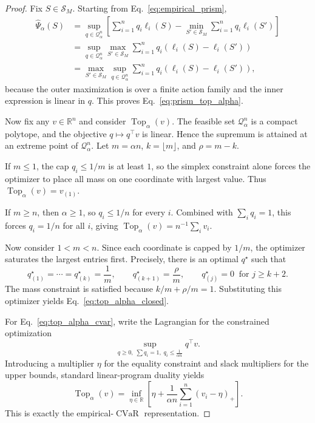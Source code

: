 \documentclass{article}
\newcommand{\RR}{\mathbb{R}}
\newcommand{\cQ}{\mathcal{Q}}
\newcommand{\cS}{\mathcal{S}}
\newcommand{\CVaR}{\operatorname{CVaR}}
\newcommand{\Top}{\operatorname{Top}}
\newcommand{\paren}[1]{\left( #1 \right)}
\newcommand{\loss}{\ell}
\newcommand{\1}{\mathbbm{1}}
\begin{document}
\begin{proof}
Fix \(S\in\cS_M\). Starting from Eq.~\eqref{eq:empirical_prism},
\begin{align}
    \widehat{\Psi}_\alpha(S)
    &=
    \sup_{q\in\cQ_\alpha^n}
    \left[
        \sum_{i=1}^{n} q_i \loss_i(S)
        -
        \min_{S'\in\cS_M}
        \sum_{i=1}^{n} q_i \loss_i(S')
    \right] \nonumber\\
    &=
    \sup_{q\in\cQ_\alpha^n}
    \max_{S'\in\cS_M}
    \sum_{i=1}^{n} q_i\paren{\loss_i(S)-\loss_i(S')} \nonumber\\
    &=
    \max_{S'\in\cS_M}
    \sup_{q\in\cQ_\alpha^n}
    \sum_{i=1}^{n} q_i\paren{\loss_i(S)-\loss_i(S')},
    \label{eq:proof_topalpha_swap}
\end{align}
because the outer maximization is over a finite action family and the inner expression is linear in \(q\). This proves Eq.~\eqref{eq:prism_top_alpha}.

Now fix any \(v\in\RR^n\) and consider \(\Top_\alpha(v)\). The feasible set \(\cQ_\alpha^n\) is a compact polytope, and the objective \(q\mapsto q^\top v\) is linear. Hence the supremum is attained at an extreme point of \(\cQ_\alpha^n\). Let \(m=\alpha n\), \(k=\lfloor m\rfloor\), and \(\rho=m-k\).

If \(m\le 1\), the cap \(q_i\le 1/m\) is at least \(1\), so the simplex constraint alone forces the optimizer to place all mass on one coordinate with largest value. Thus \(\Top_\alpha(v)=v_{(1)}\).

If \(m\ge n\), then \(\alpha \ge 1\), so \(q_i \le 1/n\) for every \(i\). Combined with \(\sum_i q_i=1\), this forces \(q_i=1/n\) for all \(i\), giving \(\Top_\alpha(v)=n^{-1}\sum_i v_i\).

Now consider \(1<m<n\). Since each coordinate is capped by \(1/m\), the optimizer saturates the largest entries first. Precisely, there is an optimal \(q^\star\) such that
\[
    q^\star_{(1)}=\cdots=q^\star_{(k)}=\frac{1}{m},\qquad
    q^\star_{(k+1)}=\frac{\rho}{m},\qquad
    q^\star_{(j)}=0 \;\; \text{for } j\ge k+2.
\]
The mass constraint is satisfied because \(k/m+\rho/m = 1\). Substituting this optimizer yields Eq.~\eqref{eq:top_alpha_closed}.

For Eq.~\eqref{eq:top_alpha_cvar}, write the Lagrangian for the constrained optimization
\[
    \sup_{q\ge 0,\;\sum q_i=1,\; q_i\le \frac{1}{\alpha n}} q^\top v.
\]
Introducing a multiplier \(\eta\) for the equality constraint and slack multipliers for the upper bounds, standard linear-program duality yields
\[
    \Top_\alpha(v)
    =
    \inf_{\eta\in\RR}
    \left[
        \eta + \frac{1}{\alpha n}\sum_{i=1}^{n}(v_i-\eta)_+
    \right].
\]
This is exactly the empirical-\(\CVaR\) representation.
\end{proof}
\end{document}
